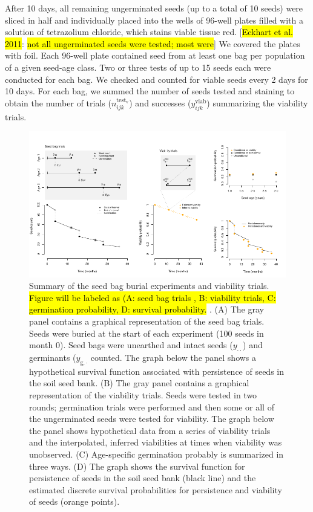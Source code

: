 \documentclass[12pt, oneside, titlepage]{article}   	%
\begin{document}
After 10 days, all remaining ungerminated seeds (up to a total of 10 seeds) were sliced in half and individually placed into the wells of 96-well plates filled with a solution of tetrazolium chloride, which stains viable tissue red. [\hl{Eckhart et al. 2011}: \hl{not all ungerminated seeds were tested; most were}] We covered the plates with foil. Each 96-well plate contained seed from at least one bag per population of a given seed-age class. Two or three tests of up to 15 seeds each were conducted for each bag. We checked and counted for viable seeds  every 2 days for 10 days.  For each bag, we summed the number of seeds tested and staining to obtain the number of trials ($n^\mathrm{test_v}_{ijk}$) and successes ($y^{\mathrm{viab}}_{ijk}$) summarizing the viability trials. 

\begin{figure}[!h]
       \includegraphics[width=\textwidth]{../../manuscript/figures/seed-bag-figure.pdf}  
    \caption{ Summary of the seed bag burial experiments and viability trials. \hl{Figure will be labeled as (A: seed bag trials , B: viability trials, C: germination probability, D: survival probability. }. (A) The gray panel contains a graphical representation of the seed bag trials. Seeds were buried at the start of each experiment (100 seeds in month 0). Seed bags were unearthed and intact seeds ($y_{\cdot \cdot}$) and germinants ($y_{\mathrm{g},\cdot}$ counted. The graph below the panel shows a hypothetical survival function associated with persistence of seeds in the soil seed bank. (B) The gray panel contains a graphical representation of the viability trials. Seeds were tested in two rounds; germination trials were performed and then some or all of the ungerminated seeds were tested for viability. The graph below the panel shows hypothetical data from a series of viability trials and the interpolated, inferred viabilities at times when viability was unobserved. (C) Age-specific germination probably is summarized in three ways. (D) The graph shows the survival function for persistence of seeds in the soil seed bank (black line) and the estimated discrete survival probabilities for persistence and viability of seeds (orange points). }
 \label{fig:seed-bag-experiments}
\end{figure}
\end{document}

